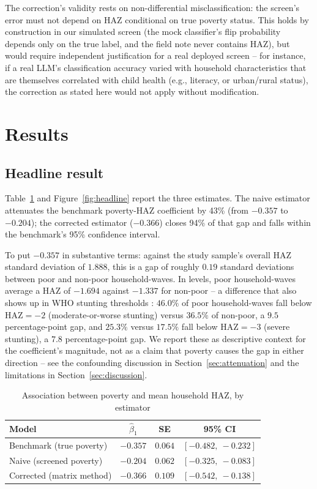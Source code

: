 \documentclass[12pt]{article}
\begin{document}
The correction's validity rests on non-differential misclassification: the screen's error must not depend on HAZ conditional on true poverty status. This holds by construction in our simulated screen (the mock classifier's flip probability depends only on the true label, and the field note never contains HAZ), but would require independent justification for a real deployed screen -- for instance, if a real LLM's classification accuracy varied with household characteristics that are themselves correlated with child health (e.g., literacy, or urban/rural status), the correction as stated here would not apply without modification.

\section{Results}
\label{sec:results}

\subsection{Headline result}

Table~\ref{tab:headline} and Figure~\ref{fig:headline} report the three estimates. The naive estimator attenuates the benchmark poverty-HAZ coefficient by 43\% (from $-0.357$ to $-0.204$); the corrected estimator ($-0.366$) closes 94\% of that gap and falls within the benchmark's 95\% confidence interval.

To put $-0.357$ in substantive terms: against the study sample's overall HAZ standard deviation of $1.888$, this is a gap of roughly $0.19$ standard deviations between poor and non-poor household-waves. In levels, poor household-waves average a HAZ of $-1.694$ against $-1.337$ for non-poor -- a difference that also shows up in WHO stunting thresholds \citep{who2006growth}: $46.0\%$ of poor household-waves fall below $\mathrm{HAZ}=-2$ (moderate-or-worse stunting) versus $36.5\%$ of non-poor, a $9.5$ percentage-point gap, and $25.3\%$ versus $17.5\%$ fall below $\mathrm{HAZ}=-3$ (severe stunting), a $7.8$ percentage-point gap. We report these as descriptive context for the coefficient's magnitude, not as a claim that poverty causes the gap in either direction -- see the confounding discussion in Section~\ref{sec:attenuation} and the limitations in Section~\ref{sec:discussion}.

\begin{table}[htbp]
\centering
\caption{Association between poverty and mean household HAZ, by estimator}
\label{tab:headline}
\begin{tabular}{lccc}
\toprule
Model & $\hat\beta_1$ & SE & 95\% CI \\
\midrule
Benchmark (true poverty) & $-0.357$ & $0.064$ & $[-0.482,\ -0.232]$ \\
Naive (screened poverty) & $-0.204$ & $0.062$ & $[-0.325,\ -0.083]$ \\
Corrected (matrix method) & $-0.366$ & $0.109$ & $[-0.542,\ -0.138]$ \\
\bottomrule
\end{tabular}
\end{table}
\end{document}
